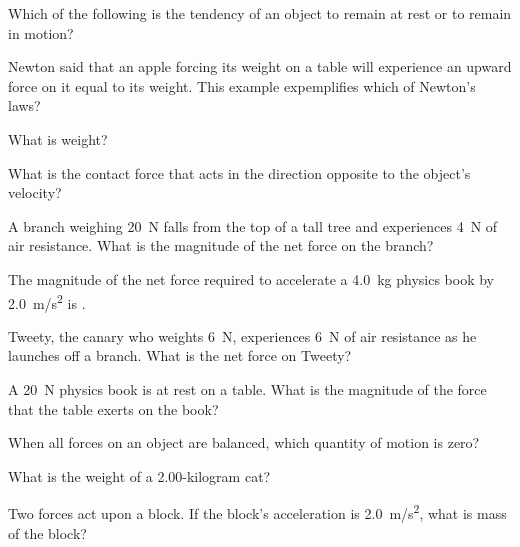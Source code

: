 \documentclass{exam}
\begin{document}
\begin{questions}
\question
Which of the following is the tendency of an object to remain at rest or to remain in motion?


\question
Newton said that an apple forcing its weight on a table will experience an upward force on it equal to its weight. This example expemplifies which of Newton's laws?

\question
What is weight?

\question
What is the contact force that acts in the direction opposite to the object's velocity?


\question
A branch weighing \SI{20}{N} falls from the top of a tall tree and experiences \SI{4}{N} of air resistance. What is the magnitude of the net force on the branch?

\question 
The magnitude of the net force required to accelerate a \SI{4.0}{kg} physics book by \SI{2.0}{m/s^2} is \fillin[\SI{8.0}{N}] .

\question
Tweety, the canary who weights \SI{6}{N}, experiences \SI{6}{N} of air resistance as he launches off a branch. What is the net force on Tweety?

\question
A \SI{20}{N} physics book is at rest on a table. What is the magnitude of the force that the table exerts on the book?

\question
When all forces on an object are balanced, which quantity of motion is zero?

\question
What is the weight of a 2.00-kilogram cat?

\question
Two forces act upon a block. If the block's acceleration is \SI{2.0}{m/s^2}, what is mass of the block?

\begin{figure}[h!]
\centering
{}
\end{figure}


\end{questions}
\end{document}
